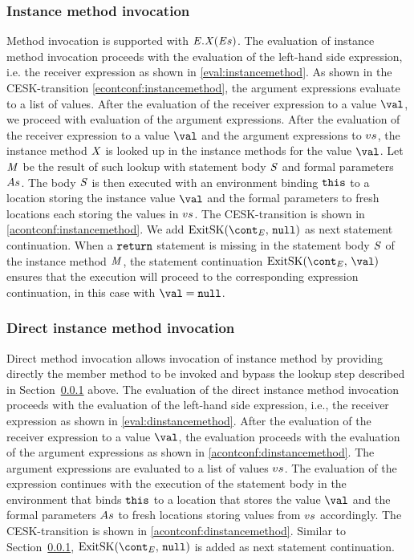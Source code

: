 \documentclass[a4paper,oneside]{article}
\begin{document}
\subsubsection{Instance method invocation}
\label{subsubsec:instance-method-invoc}

Method invocation is supported with $\mathit{E}.\mathit{X}(\mathit{E}{s})$.
The evaluation of instance method invocation proceeds with the evaluation of the left-hand side expression, i.e. the receiver expression as shown in \eqref{eval:instancemethod}.
As shown in the CESK-transition \eqref{econtconf:instancemethod}, the argument expressions evaluate to a list of values.
After the evaluation of the receiver expression to a value $\val$, we proceed with evaluation of the argument expressions.
After the evaluation of the receiver expression to a value $\val$ and the argument expressions to $vs$, the instance method $\mathit{X}$ is looked up in the instance methods for the value $\val$.
Let $\mathit{M}$ be the result of such lookup with statement body $\mathit{S}$ and formal parameters $As$.
The body $\mathit{S}$ is then executed with an environment binding $\tt{this}$ to a location storing the instance value $\val$ and the formal parameters to fresh locations each storing the values in $vs$.
The CESK-transition is shown in \eqref{acontconf:instancemethod}.
We add $\ExitSK{\tt{null}}$ as next statement continuation.
When a $\tt{return}$ statement is missing in the statement body $\mathit{S}$ of the instance method $\mathit{M}$, the statement continuation $\ExitSK{\val}$ ensures that the execution will proceed to the corresponding expression continuation, in this case with $\val = \tt{null}$.


\subsubsection{Direct instance method invocation}
\label{subsubsec:direct-instance-method-invoc}

Direct method invocation allows invocation of instance method by providing directly the member method to be invoked and bypass the lookup step described in Section~\ref{subsubsec:instance-method-invoc} above.
The evaluation of the direct instance method invocation proceeds with the evaluation of the left-hand side expression, i.e., the receiver expression as shown in \eqref{eval:dinstancemethod}.
After the evaluation of the receiver expression to a value $\val$, the evaluation proceeds with the evaluation of the argument expressions as shown in \eqref{acontconf:dinstancemethod}.
The argument expressions are evaluated to a list of values $vs$.
The evaluation of the expression continues with the execution of the statement body in the environment that binds $\tt{this}$ to a location that stores the value $\val$ and the formal parameters $As$ to fresh locations storing values from $vs$ accordingly.
The CESK-transition is shown in \eqref{acontconf:dinstancemethod}.
Similar to Section~\ref{subsubsec:instance-method-invoc}, $\ExitSK{\tt{null}}$ is added as next statement continuation.
\end{document}
